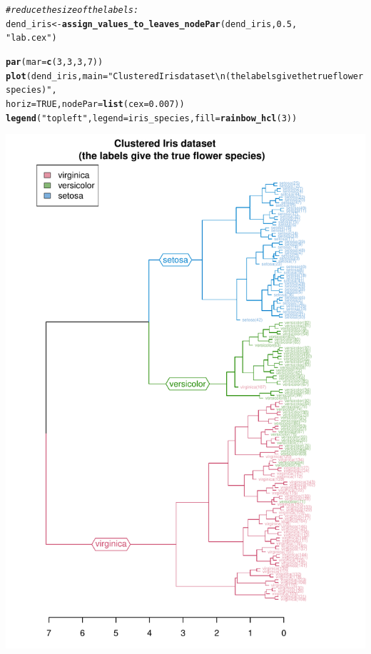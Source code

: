 \documentclass[shortnames,nojss,article]{jss}\usepackage[]{graphicx}\usepackage[]{color}
\makeatletter
\def\maxwidth{ %
  \ifdim\Gin@nat@width>\linewidth
    \linewidth
  \else
    \Gin@nat@width
  \fi
}
\newcommand{\hlnum}[1]{\textcolor[rgb]{0.686,0.059,0.569}{#1}}%
\newcommand{\hlstr}[1]{\textcolor[rgb]{0.192,0.494,0.8}{#1}}%
\newcommand{\hlcom}[1]{\textcolor[rgb]{0.678,0.584,0.686}{\textit{#1}}}%
\newcommand{\hlstd}[1]{\textcolor[rgb]{0.345,0.345,0.345}{#1}}%
\newcommand{\hlkwb}[1]{\textcolor[rgb]{0.69,0.353,0.396}{#1}}%
\newcommand{\hlkwc}[1]{\textcolor[rgb]{0.333,0.667,0.333}{#1}}%
\newcommand{\hlkwd}[1]{\textcolor[rgb]{0.737,0.353,0.396}{\textbf{#1}}}%
\newenvironment{kframe}{%
 \def\at@end@of@kframe{}%
 \ifinner\ifhmode%
  \def\at@end@of@kframe{\end{minipage}}%
  \begin{minipage}{\columnwidth}%
 \fi\fi%
 \def\FrameCommand##1{\hskip\@totalleftmargin \hskip-\fboxsep
 \colorbox{shadecolor}{##1}\hskip-\fboxsep
     \hskip-\linewidth \hskip-\@totalleftmargin \hskip\columnwidth}%
 \MakeFramed {\advance\hsize-\width
   \@totalleftmargin\z@ \linewidth\hsize
   \@setminipage}}%
 {\par\unskip\endMakeFramed%
 \at@end@of@kframe}
\newenvironment{knitrout}{}{} %
\makeatother
\begin{document}
\begin{knitrout}
\begin{kframe}
\begin{alltt}
\hlcom{# reduce the size of the labels:}
\hlstd{dend_iris} \hlkwb{<-} \hlkwd{assign_values_to_leaves_nodePar}\hlstd{(dend_iris,} \hlnum{0.5}\hlstd{,}
    \hlstr{"lab.cex"}\hlstd{)}
\end{alltt}


{\ttfamily\noindent\color{warningcolor}{\#\# Warning: Length of value vector was shorter than the number of leaves - vector value recycled}}\begin{alltt}
\hlkwd{par}\hlstd{(}\hlkwc{mar} \hlstd{=} \hlkwd{c}\hlstd{(}\hlnum{3}\hlstd{,} \hlnum{3}\hlstd{,} \hlnum{3}\hlstd{,} \hlnum{7}\hlstd{))}
\hlkwd{plot}\hlstd{(dend_iris,} \hlkwc{main} \hlstd{=} \hlstr{"Clustered Iris dataset\textbackslash{}n     (the labels give the true flower species)"}\hlstd{,}
    \hlkwc{horiz} \hlstd{=} \hlnum{TRUE}\hlstd{,} \hlkwc{nodePar} \hlstd{=} \hlkwd{list}\hlstd{(}\hlkwc{cex} \hlstd{=} \hlnum{0.007}\hlstd{))}
\hlkwd{legend}\hlstd{(}\hlstr{"topleft"}\hlstd{,} \hlkwc{legend} \hlstd{= iris_species,} \hlkwc{fill} \hlstd{=} \hlkwd{rainbow_hcl}\hlstd{(}\hlnum{3}\hlstd{))}
\end{alltt}
\end{kframe}

{\centering \includegraphics[width=\maxwidth]{figure/iris_colored_branches} 

}



\end{knitrout}
\end{document}

